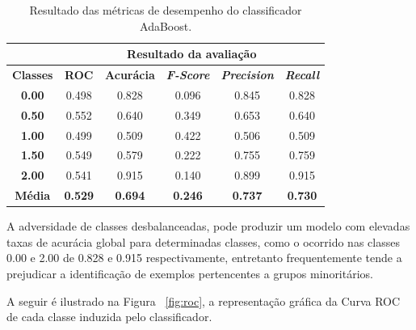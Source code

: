 \begin{table}[H]
\centering
\begin{tabular}{c|c|c|c|c|c|}
\cline{2-6}
 & \multicolumn{5}{c|}{\textbf{Resultado da avaliação}} \\ \hline
\multicolumn{1}{|c|}{\textbf{Classes}} & \textbf{ROC} & \textbf{Acurácia} & \textit{\textbf{F-Score}} & \textit{\textbf{Precision}} & \textit{\textbf{Recall}} \\ \hline
\multicolumn{1}{|c|}{\textbf{0.00}}  & 0.498 & 0.828 & 0.096 & 0.845 & 0.828 \\ \hline
\multicolumn{1}{|c|}{\textbf{0.50}}  & 0.552 & 0.640 & 0.349 & 0.653 & 0.640 \\ \hline
\multicolumn{1}{|c|}{\textbf{1.00}}  & 0.499 & 0.509 & 0.422 & 0.506 & 0.509 \\ \hline
\multicolumn{1}{|c|}{\textbf{1.50}}  & 0.549 & 0.579 & 0.222 & 0.755 & 0.759 \\ \hline
\multicolumn{1}{|c|}{\textbf{2.00}}  & 0.541 & 0.915 & 0.140 & 0.899 & 0.915 \\ \hline
\multicolumn{1}{|c|}{\textbf{Média}} & \textbf{0.529} & \textbf{0.694} & \textbf{0.246} & \textbf{0.737} & \textbf{0.730} \\ \hline
\end{tabular}
\caption{Resultado das métricas de desempenho do classificador AdaBoost.}
\label{tab:evaluation_result}
\end{table}

A adversidade de classes desbalanceadas, pode produzir um modelo com elevadas taxas de acurácia global para determinadas classes, como o ocorrido nas classes 0.00 e 2.00 de 0.828 e 0.915 respectivamente, entretanto frequentemente tende a prejudicar a identificação de exemplos pertencentes a grupos minoritários.

A seguir é ilustrado na Figura ~\ref{fig:roc}, a representação gráfica da Curva ROC de cada classe induzida pelo classificador.

